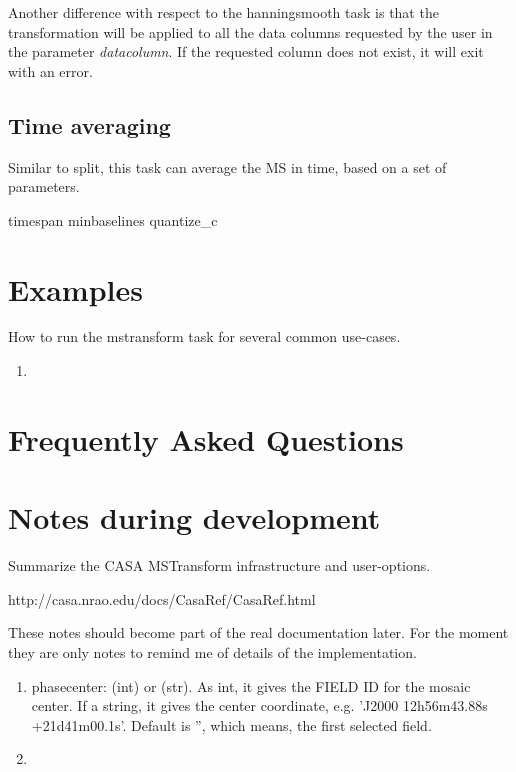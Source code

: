 Another difference with respect to the hanningsmooth task is that the transformation will be 
applied to all the data columns requested by the user in the parameter {\it datacolumn}. If the 
requested column does not exist, it will exit with an error. 

\subsection{Time averaging}
Similar to split, this task can average the MS in time, based on a set of parameters.

timespan
minbaselines
quantize_c


\section{Examples}\label{Sec:Examples}
How to run the mstransform task for several common use-cases.

\begin{enumerate}
\item 
\end{enumerate}

\section{Frequently Asked Questions}\label{Sec:FAQ}


\section{Notes during development}

Summarize the CASA MSTransform infrastructure and user-options.

 {http://casa.nrao.edu/docs/CasaRef/CasaRef.html}

These notes should become part of the real documentation later. For the moment they are
only notes to remind me of details of the implementation.

\begin{enumerate}
\item phasecenter: (int) or (str). As int, it gives the FIELD ID for the mosaic center. If a string,
it gives the center coordinate, e.g. 'J2000 12h56m43.88s +21d41m00.1s'. Default is '', which means, the 
first selected field.
       
\item 
\end{enumerate}

